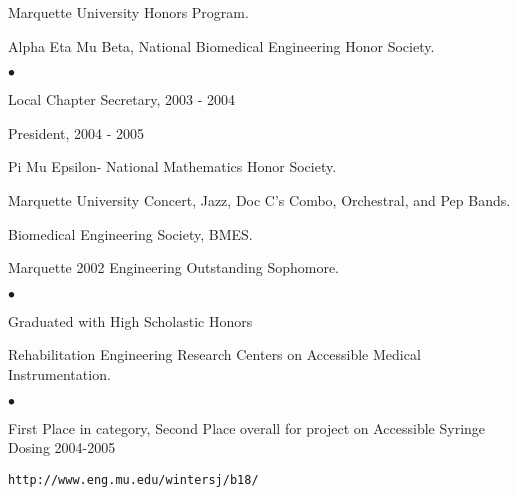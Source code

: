\documentclass[margin,line]{res}
\newenvironment{list2}{
  \begin{list}{$\bullet$}{%
      \setlength{\itemsep}{0in}
      \setlength{\parsep}{0in} \setlength{\parskip}{0in}
      \setlength{\topsep}{0in} \setlength{\partopsep}{0in} 
      \setlength{\leftmargin}{0.2in}}}{\end{list}}
\begin{document}
\begin{resume}
Marquette University Honors Program.

Alpha Eta Mu Beta, National Biomedical Engineering Honor Society.
\begin{list2}
 \item Local Chapter Secretary, 2003 - 2004
 \item President, 2004 - 2005
\end{list2}

Pi Mu Epsilon- National Mathematics Honor Society.

Marquette University Concert, Jazz, Doc C's Combo, Orchestral, and Pep Bands.

Biomedical Engineering Society, BMES.

Marquette 2002 Engineering Outstanding Sophomore.
\begin{list2}
\item Graduated with High Scholastic Honors
\end{list2}

Rehabilitation Engineering Research Centers on Accessible Medical
Instrumentation.
\begin{list2}
 \item First Place in category, Second Place overall for project on Accessible Syringe Dosing 2004-2005
 \item \begin{verbatim}http://www.eng.mu.edu/wintersj/b18/\end{verbatim}
\end{list2}
%





\end{resume}
\end{document}
